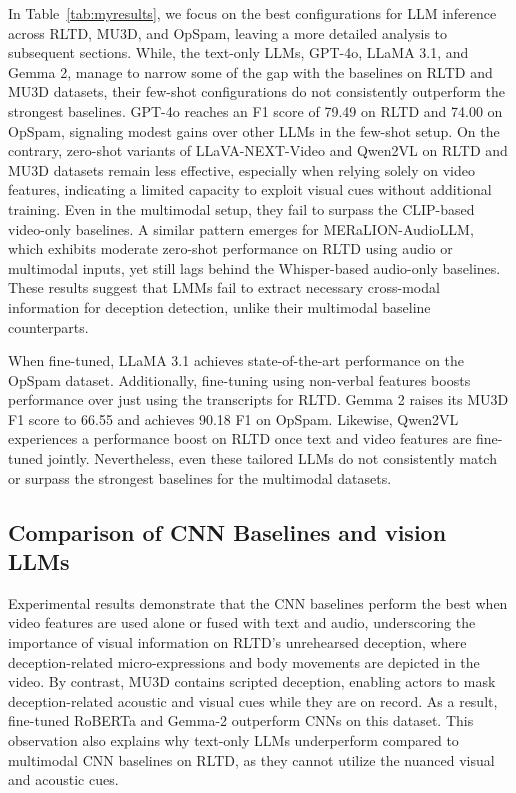 In Table~\ref{tab:myresults}, we focus on the best configurations for LLM inference across RLTD, MU3D, and OpSpam, leaving a more detailed analysis to subsequent sections. While, the text-only LLMs, GPT-4o, LLaMA 3.1, and Gemma 2, manage to narrow some of the gap with the baselines on RLTD and MU3D datasets, their few-shot configurations do not consistently outperform the strongest baselines. GPT-4o reaches an F1 score of 79.49 on RLTD and 74.00 on OpSpam, signaling modest gains over other LLMs in the few-shot setup. On the contrary, zero-shot variants of LLaVA-NEXT-Video and Qwen2VL on RLTD and MU3D datasets remain less effective, especially when relying solely on video features, indicating a limited capacity to exploit visual cues without additional training. Even in the multimodal setup, they fail to surpass the CLIP-based video-only baselines. A similar pattern emerges for MERaLION-AudioLLM, which exhibits moderate zero-shot performance on RLTD using audio or multimodal inputs, yet still lags behind the Whisper-based audio-only baselines. These results suggest that LMMs fail to extract necessary cross-modal information for deception detection, unlike their multimodal baseline counterparts.

When fine-tuned, LLaMA 3.1 achieves state-of-the-art performance on the OpSpam dataset. Additionally, fine-tuning using non-verbal features boosts performance over just using the transcripts for RLTD. Gemma 2 raises its MU3D F1 score to 66.55 and achieves 90.18 F1 on OpSpam. Likewise, Qwen2VL experiences a performance boost on RLTD once text and video features are fine-tuned jointly. Nevertheless, even these tailored LLMs do not consistently match or surpass the strongest baselines for the multimodal datasets. 

\subsection{Comparison of CNN Baselines and vision LLMs}
% 
Experimental results demonstrate that the CNN baselines perform the best when video features are used alone or fused with text and audio, underscoring the importance of visual information on RLTD’s unrehearsed deception, where deception-related micro-expressions and body movements are depicted in the video. By contrast, MU3D contains scripted deception, enabling actors to mask deception-related acoustic and visual cues while they are on record. As a result, fine-tuned RoBERTa and Gemma-2 outperform CNNs on this dataset. This observation also explains why text-only LLMs underperform compared to multimodal CNN baselines on RLTD, as they cannot utilize the nuanced visual and acoustic cues. 

